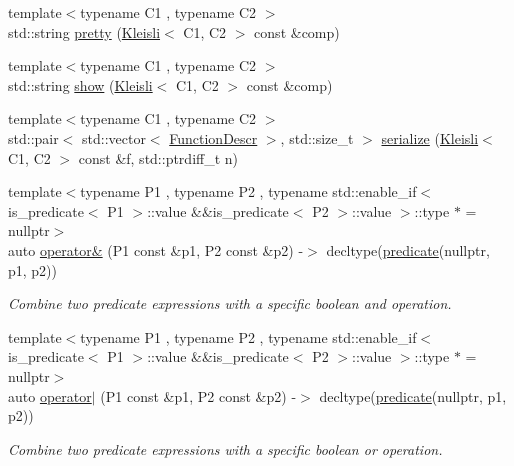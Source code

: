 \begin{DoxyCompactItemize}
{\footnotesize template$<$typename C1 , typename C2 $>$ }\\std\+::string \hyperlink{namespacepfq_1_1lang_a11d127d1c25e1628bc76dd2067467dcd}{pretty} (\hyperlink{structpfq_1_1lang_1_1Kleisli}{Kleisli}$<$ C1, C2 $>$ const \&comp)
\item 
{\footnotesize template$<$typename C1 , typename C2 $>$ }\\std\+::string \hyperlink{namespacepfq_1_1lang_aecdf72ea1b9163a219332275af8c81f2}{show} (\hyperlink{structpfq_1_1lang_1_1Kleisli}{Kleisli}$<$ C1, C2 $>$ const \&comp)
\item 
{\footnotesize template$<$typename C1 , typename C2 $>$ }\\std\+::pair$<$ std\+::vector$<$ \hyperlink{structpfq_1_1lang_1_1FunctionDescr}{Function\+Descr} $>$, std\+::size\+\_\+t $>$ \hyperlink{namespacepfq_1_1lang_ac064e0b32cebb9c8f7073ba87a840d42}{serialize} (\hyperlink{structpfq_1_1lang_1_1Kleisli}{Kleisli}$<$ C1, C2 $>$ const \&f, std\+::ptrdiff\+\_\+t n)
\item 
{\footnotesize template$<$typename P1 , typename P2 , typename std\+::enable\+\_\+if$<$ is\+\_\+predicate$<$ P1 $>$\+::value \&\&is\+\_\+predicate$<$ P2 $>$\+::value $>$\+::type $\ast$  = nullptr$>$ }\\auto \hyperlink{namespacepfq_1_1lang_af24d9c3092f064b0732a4b601dde2c64}{operator\&} (P1 const \&p1, P2 const \&p2) -\/$>$ decltype(\hyperlink{namespacepfq_1_1lang_aca9adafc436b7f851621b979fa1aaf88}{predicate}(nullptr, p1, p2))
\begin{DoxyCompactList}\small\item\em Combine two predicate expressions with a specific boolean \textquotesingle{}and\textquotesingle{} operation. \end{DoxyCompactList}\item 
{\footnotesize template$<$typename P1 , typename P2 , typename std\+::enable\+\_\+if$<$ is\+\_\+predicate$<$ P1 $>$\+::value \&\&is\+\_\+predicate$<$ P2 $>$\+::value $>$\+::type $\ast$  = nullptr$>$ }\\auto \hyperlink{namespacepfq_1_1lang_a425bb535884185450da7addcdb47f35b}{operator$\vert$} (P1 const \&p1, P2 const \&p2) -\/$>$ decltype(\hyperlink{namespacepfq_1_1lang_aca9adafc436b7f851621b979fa1aaf88}{predicate}(nullptr, p1, p2))
\begin{DoxyCompactList}\small\item\em Combine two predicate expressions with a specific boolean \textquotesingle{}or\textquotesingle{} operation. \end{DoxyCompactList}\item 

\end{DoxyCompactItemize}

